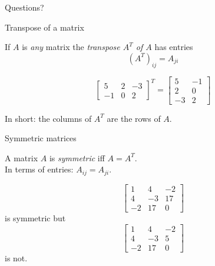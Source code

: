\documentclass{beamer}
\begin{document}
\begin{frame}
  Questions?
\end{frame}

\begin{frame}{Transpose of a matrix}
  \begin{definition}
    If $A$ is \emph{any} matrix the \emph{transpose $A^T$ of $A$} has entries
    \begin{equation*}
      (A^T)_{ij} = A_{ji}
    \end{equation*}
  \end{definition}
  \begin{example}
    \begin{equation*}
      \left[
        \begin{array}{ccc}
          5 & 2 & -3\\
          -1 & 0 & 2
        \end{array}
      \right]^T =
      \left[
        \begin{array}{cc}
          5 & -1\\
          2 & 0\\
          -3 & 2
        \end{array}
      \right]
    \end{equation*}
  \end{example}
  In short: the columns of $A^T$ are the rows of $A$.
\end{frame}

\begin{frame}{Symmetric matrices}
  \begin{definition}
    A matrix $A$ is \emph{symmetric} iff $A = A^T$.\\
    In terms of entries: $A_{ij} = A_{ji}$.
  \end{definition}
  \begin{example}
    \begin{equation*}
      \left[
      \begin{array}{ccc}
        1 & 4 & -2\\
        4 & -3 & 17\\
        -2 & 17 & 0
      \end{array}
      \right]
    \end{equation*}
    is symmetric but
    \begin{equation*}
      \left[
      \begin{array}{ccc}
	1 & 4 & -2\\
        4 & -3 & 5\\
        -2 & 17 & 0
      \end{array}
      \right]
    \end{equation*}
    is not.
  \end{example}
\end{frame}
\end{document}
